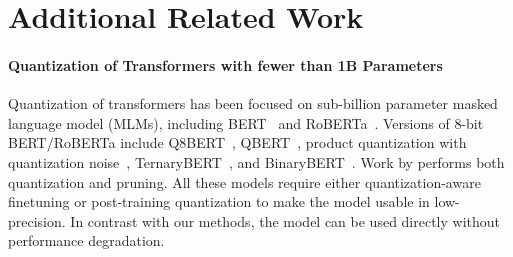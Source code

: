 \documentclass{article}
\begin{document}
\begin{table}[h]
\centering
\caption{Different hardware setups and which methods can be run in 16-bit vs. 8-bit precision. We can see that our 8-bit method makes many models accessible that were not accessible before, in particular, OPT-175B/BLOOM.}
\label{tbl:memsavings}
\end{table}

\section{Additional Related Work}
\label{appendix:relatedwork}

\paragraph{Quantization of Transformers with fewer than 1B Parameters}

Quantization of transformers has been focused on sub-billion parameter masked language  model (MLMs), including  BERT~\citep{devlin2018bert} and RoBERTa~\citep{liu2019roberta}.
Versions of 8-bit BERT/RoBERTa include Q8BERT~\citep{zafrir2019q8bert}, QBERT~\citep{shen2020q}, product quantization with quantization noise~\citep{fan2020training}, TernaryBERT~\citep{Zhang2020TernaryBERTDU}, and BinaryBERT~\citep{Bai2021BinaryBERTPT}. Work by \citet{zhao2021automatic} performs both quantization and pruning. All these models require either quantization-aware finetuning or post-training quantization to make the model usable in low-precision. 
In contrast with our methods, the model can be used directly without performance degradation.
\end{document}
